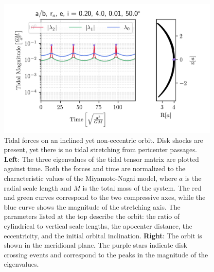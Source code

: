             \begin{figure}
                \includegraphics[width=\linewidth]{images/miyamoto_disc_shocks_ab_rp_e_i_0.20_4.0_0.01_50.0.png}
                \caption{Tidal forces on an inclined yet non-eccentric orbit. Disk shocks are present, yet there is no tidal stretching from pericenter passages. \textbf{Left}: The three eigenvalues of the tidal tensor matrix are plotted against time. Both the forces and time are normalized to the characteristic values of the Miyamoto-Nagai model, where $a$ is the radial scale length and $M$ is the total mass of the system. The red and green curves correspond to the two compressive axes, while the blue curve shows the magnitude of the stretching axis. The parameters listed at the top describe the orbit: the ratio of cylindrical to vertical scale lengths, the apocenter distance, the eccentricity, and the initial orbital inclination. \textbf{Right}: The orbit is shown in the meridional plane. The purple stars indicate disk crossing events and correspond to the peaks in the magnitude of the eigenvalues. }
                \label{fig:miyamoto_disc_shocks_circular_inclined_orbit}
            \end{figure}


